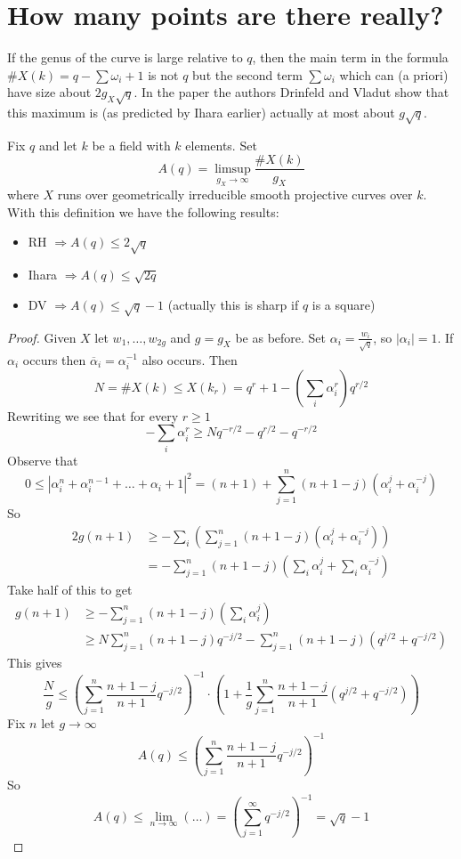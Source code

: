 \section{How many points are there really?}
\label{trace-section-really}
If the genus of the curve is large relative to $q$, then the main
term in the formula $\# X(k) = q - \sum \omega_i + 1$ is not $q$
but the second term $\sum \omega_i$ which can (a priori) have
size about $2g_X\sqrt{q}$. In the paper \cite{Drinfeld-number}
the authors Drinfeld and Vladut show that this maximum is (as predicted
by Ihara earlier) actually at most about $g\sqrt{q}$.

\medskip\noindent
Fix $q$ and let $k$ be a field with $k$ elements. Set
$$
A(q) = \limsup_{g_X \to \infty} \frac{\# X(k)}{g_X}
$$
where $X$ runs over geometrically irreducible smooth projective
curves over $k$. With this definition we have the following results:
\begin{itemize}
\item RH $\Rightarrow A(q)\leq 2\sqrt{q}$
\item Ihara $\Rightarrow A(q)\leq \sqrt{2q}$
\item DV $\Rightarrow A(q)\leq \sqrt{q}-1$ (actually this is sharp if $q$
is a square)
\end{itemize}

\begin{proof}
Given $X$ let $w_1, \ldots, w_{2g}$ and $g = g_X$ be as before. Set
$\alpha_i = \frac{w_i}{\sqrt{q}}$, so $|\alpha_i| = 1$. If $\alpha_i$
occurs then $\overline{\alpha}_i = \alpha_i^{-1}$ also occurs. Then
$$
N = \# X(k) \leq X(k_r) = q^r + 1 - (\sum_i \alpha_i^r) q^{r/2}
$$
Rewriting we see that for every $r \geq 1$
$$
-\sum_i \alpha_i^r \geq Nq^{-r/2} - q^{r/2} - q^{-r/2}
$$
Observe that
$$
0 \leq |\alpha_i^n +\alpha_i^{n-1} +\ldots +\alpha_i +1|^2
= (n + 1) + \sum_{j = 1}^n (n + 1 - j) (\alpha_i^j + \alpha_i^{-j})
$$
So
\begin{align*}
2g(n+1) & \geq - \sum_i \left(\sum_{j = 1}^n (n+1-j)(\alpha_i^j
+\alpha_i^{-j})\right)\\
& =-\sum_{j = 1}^n (n+1-j)\left(\sum_i\alpha_i^j
+\sum_i\alpha_i^{-j}\right)
\end{align*}
Take half of this to get
\begin{align*}
g(n+1)& \geq - \sum_{j = 1}^n (n+1-j)(\sum_i\alpha_i^j)\\
& \geq N\sum_{j = 1}^n (n+1-j)q^{-j/2}-\sum_{j = 1}^n
(n+1-j)(q^{j/2}+q^{-j/2})
\end{align*}
This gives
$$
\frac{N}{g}\leq \left(\sum_{j = 1}^n \frac{n+1-j}{n+1}q^{-j/2} \right)^{-1}
\cdot
\left(
1 + \frac{1}{g} \sum_{j = 1}^n \frac{n + 1 - j}{n + 1}(q^{j/2} + q^{-j/2})
\right)
$$
Fix $n$ let $g\to \infty$
$$
A(q)\leq \left(\sum_{j = 1}^n \frac{n+1-j}{n+1}q^{-j/2}\right)^{-1}
$$
So
$$
A(q)\leq \lim_{n\to\infty}(\ldots) = \left(\sum_{j = 1}^\infty
q^{-j/2}\right)^{-1}=\sqrt{q}-1
$$
\end{proof}



